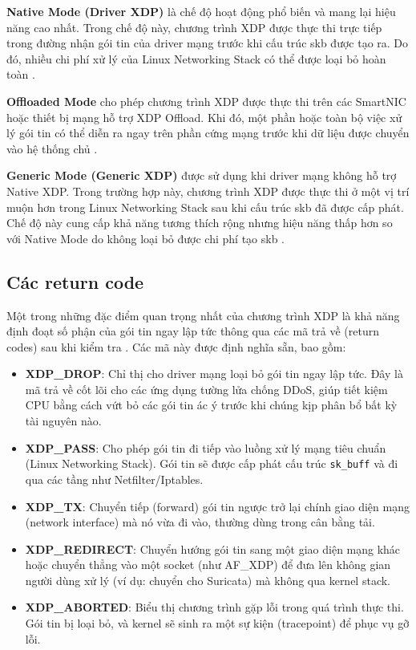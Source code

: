 \documentclass[../DoAn.tex]{subfiles}
\begin{document}
\textbf{Native Mode (Driver XDP)} là chế độ hoạt động phổ biến và mang lại hiệu năng cao nhất. Trong chế độ này, chương trình XDP được thực thi trực tiếp trong đường nhận gói tin của driver mạng trước khi cấu trúc skb được tạo ra. Do đó, nhiều chi phí xử lý của Linux Networking Stack có thể được loại bỏ hoàn toàn \cite{xdp_docs}.

\textbf{Offloaded Mode} cho phép chương trình XDP được thực thi trên các SmartNIC hoặc thiết bị mạng hỗ trợ XDP Offload. Khi đó, một phần hoặc toàn bộ việc xử lý gói tin có thể diễn ra ngay trên phần cứng mạng trước khi dữ liệu được chuyển vào hệ thống chủ \cite{xdp_docs, cilium_bpf_docs}.

\textbf{Generic Mode (Generic XDP)} được sử dụng khi driver mạng không hỗ trợ Native XDP. Trong trường hợp này, chương trình XDP được thực thi ở một vị trí muộn hơn trong Linux Networking Stack sau khi cấu trúc skb đã được cấp phát. Chế độ này cung cấp khả năng tương thích rộng nhưng hiệu năng thấp hơn so với Native Mode do không loại bỏ được chi phí tạo skb \cite{xdp_docs, linux_skbuff}.
\subsection{Các return code}
Một trong những đặc điểm quan trọng nhất của chương trình XDP là khả năng định đoạt số phận của gói tin ngay lập tức thông qua các mã trả về (return codes) sau khi kiểm tra \cite{xdp_docs, cilium_bpf_docs}. Các mã này được định nghĩa sẵn, bao gồm:

\begin{itemize}
    \item \textbf{XDP\_DROP}: Chỉ thị cho driver mạng loại bỏ gói tin ngay lập tức. Đây là mã trả về cốt lõi cho các ứng dụng tường lửa chống DDoS, giúp tiết kiệm CPU bằng cách vứt bỏ các gói tin ác ý trước khi chúng kịp phân bổ bất kỳ tài nguyên nào.
    \item \textbf{XDP\_PASS}: Cho phép gói tin đi tiếp vào luồng xử lý mạng tiêu chuẩn (Linux Networking Stack). Gói tin sẽ được cấp phát cấu trúc \texttt{sk\_buff} và đi qua các tầng như Netfilter/Iptables.
    \item \textbf{XDP\_TX}: Chuyển tiếp (forward) gói tin ngược trở lại chính giao diện mạng (network interface) mà nó vừa đi vào, thường dùng trong cân bằng tải.
    \item \textbf{XDP\_REDIRECT}: Chuyển hướng gói tin sang một giao diện mạng khác hoặc chuyển thẳng vào một socket (như AF\_XDP) để đưa lên không gian người dùng xử lý (ví dụ: chuyển cho Suricata) mà không qua kernel stack.
    \item \textbf{XDP\_ABORTED}: Biểu thị chương trình gặp lỗi trong quá trình thực thi. Gói tin bị loại bỏ, và kernel sẽ sinh ra một sự kiện (tracepoint) để phục vụ gỡ lỗi.
\end{itemize}
\end{document}
